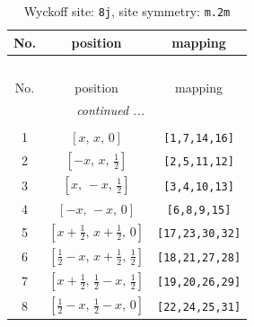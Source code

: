 \documentclass[fleqn,8pt]{jsarticle}
\begin{document}
\begin{longtable}{ccc}
\caption{Wyckoff site: {\tt 8j}, site symmetry: {\tt m.2m}}
 \\
 \hline \hline
No. & position & mapping \\ \hline \endfirsthead

\multicolumn{2}{l}{\tablename\ \thetable{}} \\
 \hline \hline
No. & position & mapping \\ \hline \endhead

 \hline \hline
\multicolumn{2}{r}{\footnotesize\it continued ...} \\ \endfoot

 \hline \hline
\multicolumn{2}{r}{} \\ \endlastfoot

1 & $\left[ x,\, x,\, 0 \right]$ & {\tt [1,7,14,16]} \\ \hline
2 & $\left[ - x,\, x,\, \frac{1}{2} \right]$ & {\tt [2,5,11,12]} \\ \hline
3 & $\left[ x,\, - x,\, \frac{1}{2} \right]$ & {\tt [3,4,10,13]} \\ \hline
4 & $\left[ - x,\, - x,\, 0 \right]$ & {\tt [6,8,9,15]} \\ \hline
5 & $\left[ x + \frac{1}{2},\, x + \frac{1}{2},\, 0 \right]$ & {\tt [17,23,30,32]} \\ \hline
6 & $\left[ \frac{1}{2} - x,\, x + \frac{1}{2},\, \frac{1}{2} \right]$ & {\tt [18,21,27,28]} \\ \hline
7 & $\left[ x + \frac{1}{2},\, \frac{1}{2} - x,\, \frac{1}{2} \right]$ & {\tt [19,20,26,29]} \\ \hline
8 & $\left[ \frac{1}{2} - x,\, \frac{1}{2} - x,\, 0 \right]$ & {\tt [22,24,25,31]} \\
\end{longtable}
\renewcommand{\arraystretch}{1.2}
\end{document}
